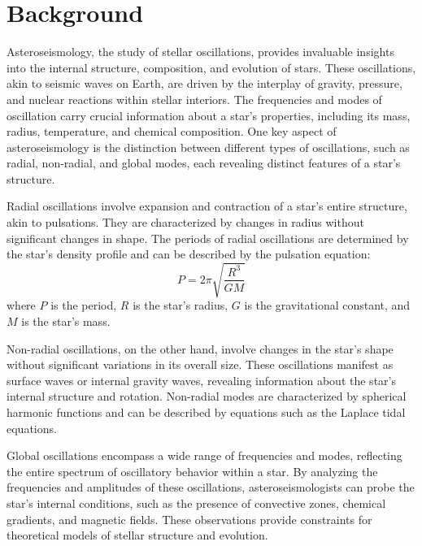 \documentclass{article}
\begin{document}

\section{Background}

Asteroseismology, the study of stellar oscillations, provides invaluable insights into the internal structure, composition, and evolution of stars. These oscillations, akin to seismic waves on Earth, are driven by the interplay of gravity, pressure, and nuclear reactions within stellar interiors. The frequencies and modes of oscillation carry crucial information about a star's properties, including its mass, radius, temperature, and chemical composition. One key aspect of asteroseismology is the distinction between different types of oscillations, such as radial, non-radial, and global modes, each revealing distinct features of a star's structure.

Radial oscillations involve expansion and contraction of a star's entire structure, akin to pulsations. They are characterized by changes in radius without significant changes in shape. The periods of radial oscillations are determined by the star's density profile and can be described by the pulsation equation:
\begin{equation}
P = 2\pi \sqrt{\frac{R^3}{GM}}
\end{equation}
where \(P\) is the period, \(R\) is the star's radius, \(G\) is the gravitational constant, and \(M\) is the star's mass.

Non-radial oscillations, on the other hand, involve changes in the star's shape without significant variations in its overall size. These oscillations manifest as surface waves or internal gravity waves, revealing information about the star's internal structure and rotation. Non-radial modes are characterized by spherical harmonic functions and can be described by equations such as the Laplace tidal equations.

Global oscillations encompass a wide range of frequencies and modes, reflecting the entire spectrum of oscillatory behavior within a star. By analyzing the frequencies and amplitudes of these oscillations, asteroseismologists can probe the star's internal conditions, such as the presence of convective zones, chemical gradients, and magnetic fields. These observations provide constraints for theoretical models of stellar structure and evolution.
\end{document}
